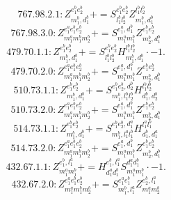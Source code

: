 \documentclass[letterpaper,10pt,fleqn,leqno,onecolumn]{article}
\begin{document}
\begin{equation} \;\;\;\;\;\;  767.98.2.1: Z^{e_{1}^{b}e_{2}^{b}}_{m_{1}^{b},d_{1}^{b}}+=S^{e_{1}^{b}e_{2}^{b}}_{l_{1}^{b}l_{2}^{b}}Z^{l_{1}^{b}l_{2}^{b}}_{m_{1}^{b},d_{1}^{b}} \end{equation}
\begin{equation} \;\;\;\;\;\;  767.98.3.0: Z^{e_{1}^{a}e_{1}^{b}e_{2}^{b}}_{m_{1}^{a}m_{1}^{b}m_{2}^{b}}+=S^{e_{1}^{a},d_{1}^{b}}_{m_{1}^{a}m_{1}^{b}}Z^{e_{1}^{b}e_{2}^{b}}_{m_{2}^{b},d_{1}^{b}} \end{equation}
\begin{equation} \;\;\;\;\;\;  479.70.1.1: Z^{e_{1}^{b}e_{2}^{b}}_{m_{1}^{b},d_{1}^{b}}+=S^{e_{1}^{b}e_{2}^{b}}_{l_{1}^{b}l_{2}^{b}}H^{l_{1}^{b}l_{2}^{b}}_{m_{1}^{b},d_{1}^{b}}\cdot -1. \end{equation}
\begin{equation} \;\;\;\;\;\;  479.70.2.0: Z^{e_{1}^{a}e_{1}^{b}e_{2}^{b}}_{m_{1}^{a}m_{1}^{b}m_{2}^{b}}+=S^{e_{1}^{a},d_{1}^{b}}_{m_{1}^{a}m_{1}^{b}}Z^{e_{1}^{b}e_{2}^{b}}_{m_{2}^{b},d_{1}^{b}} \end{equation}
\begin{equation} \;\;\;\;\;\;  510.73.1.1: Z^{e_{1}^{b}e_{2}^{b}}_{m_{1}^{b},d_{1}^{b}}+=S^{e_{1}^{b}e_{2}^{b},d_{2}^{b}}_{m_{1}^{b},l_{1}^{b}l_{2}^{b}}H^{l_{1}^{b}l_{2}^{b}}_{d_{1}^{b},d_{2}^{b}} \end{equation}
\begin{equation} \;\;\;\;\;\;  510.73.2.0: Z^{e_{1}^{a}e_{1}^{b}e_{2}^{b}}_{m_{1}^{a}m_{1}^{b}m_{2}^{b}}+=S^{e_{1}^{a},d_{1}^{b}}_{m_{1}^{a}m_{1}^{b}}Z^{e_{1}^{b}e_{2}^{b}}_{m_{2}^{b},d_{1}^{b}} \end{equation}
\begin{equation} \;\;\;\;\;\;  514.73.1.1: Z^{e_{1}^{b}e_{2}^{b}}_{m_{1}^{b},d_{1}^{b}}+=S^{e_{1}^{b}e_{2}^{b},d_{1}^{a}}_{m_{1}^{b},l_{1}^{a}l_{1}^{b}}H^{l_{1}^{a}l_{1}^{b}}_{d_{1}^{b},d_{1}^{a}} \end{equation}
\begin{equation} \;\;\;\;\;\;  514.73.2.0: Z^{e_{1}^{a}e_{1}^{b}e_{2}^{b}}_{m_{1}^{a}m_{1}^{b}m_{2}^{b}}+=S^{e_{1}^{a},d_{1}^{b}}_{m_{1}^{a}m_{1}^{b}}Z^{e_{1}^{b}e_{2}^{b}}_{m_{2}^{b},d_{1}^{b}} \end{equation}
\begin{equation} \;\;\;\;\;\;  432.67.1.1: Z^{e_{1}^{b},l_{1}^{a}}_{m_{1}^{a}m_{1}^{b}}+=H^{e_{1}^{b},l_{1}^{a}}_{d_{1}^{a}d_{1}^{b}}S^{d_{1}^{a}d_{1}^{b}}_{m_{1}^{a}m_{1}^{b}}\cdot -1. \end{equation}
\begin{equation} \;\;\;\;\;\;  432.67.2.0: Z^{e_{1}^{a}e_{1}^{b}e_{2}^{b}}_{m_{1}^{a}m_{1}^{b}m_{2}^{b}}+=S^{e_{1}^{a}e_{1}^{b}}_{m_{1}^{b},l_{1}^{a}}Z^{e_{2}^{b},l_{1}^{a}}_{m_{1}^{a}m_{2}^{b}} \end{equation}
\end{document}
